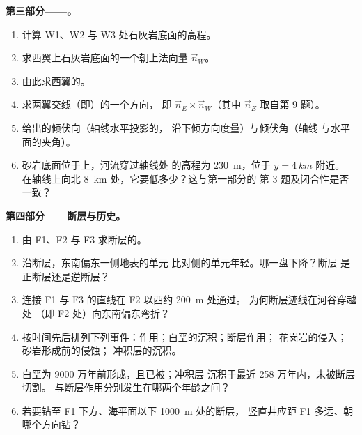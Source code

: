 \begin{problem}
\medskip
\noindent\textbf{第三部分——。}
\begin{enumerate}[resume]
  \item 计算 W1、W2 与
        W3 处石灰岩底面的高程。
  \item 求西翼上石灰岩底面的一个朝上法向量
        $\vec n_W$。
  \item 由此求西翼的。
  \item 求两翼交线（即）的一个方向，
        即 $\vec n_E \times \vec n_W$（其中 $\vec n_E$ 取自第 9 题）。
  \item 给出的倾伏向（轴线水平投影的，
        沿下倾方向度量）与倾伏角（轴线
        与水平面的夹角）。
  \item 砂岩底面位于上，河流穿过轴线处
        的高程为 \qty{230}{m}，位于 $y = \qty{4}{km}$ 附近。
        在轴线上向北 \qty{8}{km} 处，它要低多少？这与第一部分的
        第 3 题及闭合性是否一致？
\end{enumerate}

\medskip
\noindent\textbf{第四部分——断层与历史。}
\begin{enumerate}[resume]
  \item 由 F1、F2 与 F3 求断层的。
  \item 沿断层，东南偏东一侧地表的单元
        比对侧的单元年轻。哪一盘下降？断层
        是正断层还是逆断层？
  \item 连接 F1 与 F3 的直线在 F2 以西约 \qty{200}{m} 处通过。
        为何断层迹线在河谷穿越处
        （即 F2 处）向东南偏东弯折？
  \item 按时间先后排列下列事件：作用；白垩的沉积；断层作用；
        花岗岩的侵入；砂岩形成前的侵蚀；
        冲积层的沉积。
  \item 白垩为 9000 万年前形成，且已被；冲积层
        沉积于最近 258 万年内，未被断层切割。
        与断层作用分别发生在哪两个年龄之间？
  \item 若要钻至 F1 下方、海平面以下 \qty{1000}{m} 处的断层，
        竖直井应距 F1 多远、朝哪个方向钻？
\end{enumerate}
\end{problem}
